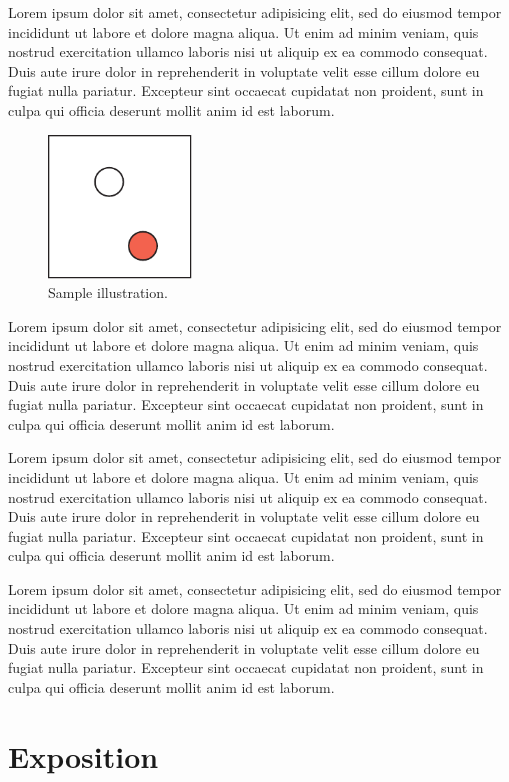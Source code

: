 \documentclass[annual]{acmsiggraph}
\begin{document}
Lorem ipsum dolor sit amet, consectetur adipisicing elit, sed do
eiusmod tempor incididunt ut labore et dolore magna aliqua. Ut enim ad
minim veniam, quis nostrud exercitation ullamco laboris nisi ut
aliquip ex ea commodo consequat. Duis aute irure dolor in
reprehenderit in voluptate velit esse cillum dolore eu fugiat nulla
pariatur. Excepteur sint occaecat cupidatat non proident, sunt in
culpa qui officia deserunt mollit anim id est laborum.
\begin{figure}[ht]
  \centering
  \includegraphics[width=1.5in]{images/samplefigure}
  \caption{Sample illustration.}
\end{figure}
Lorem ipsum dolor sit amet, consectetur adipisicing elit, sed do
eiusmod tempor incididunt ut labore et dolore magna aliqua. Ut enim ad
minim veniam, quis nostrud exercitation ullamco laboris nisi ut
aliquip ex ea commodo consequat. Duis aute irure dolor in
reprehenderit in voluptate velit esse cillum dolore eu fugiat nulla
pariatur. Excepteur sint occaecat cupidatat non proident, sunt in
culpa qui officia deserunt mollit anim id est laborum.

Lorem ipsum dolor sit amet, consectetur adipisicing elit, sed do
eiusmod tempor incididunt ut labore et dolore magna aliqua. Ut enim ad
minim veniam, quis nostrud exercitation ullamco laboris nisi ut
aliquip ex ea commodo consequat. Duis aute irure dolor in
reprehenderit in voluptate velit esse cillum dolore eu fugiat nulla
pariatur. Excepteur sint occaecat cupidatat non proident, sunt in
culpa qui officia deserunt mollit anim id est laborum.

Lorem ipsum dolor sit amet, consectetur adipisicing elit, sed do
eiusmod tempor incididunt ut labore et dolore magna aliqua. Ut enim ad
minim veniam, quis nostrud exercitation ullamco laboris nisi ut
aliquip ex ea commodo consequat. Duis aute irure dolor in
reprehenderit in voluptate velit esse cillum dolore eu fugiat nulla
pariatur. Excepteur sint occaecat cupidatat non proident, sunt in
culpa qui officia deserunt mollit anim id est laborum.

\section{Exposition}
\end{document}
